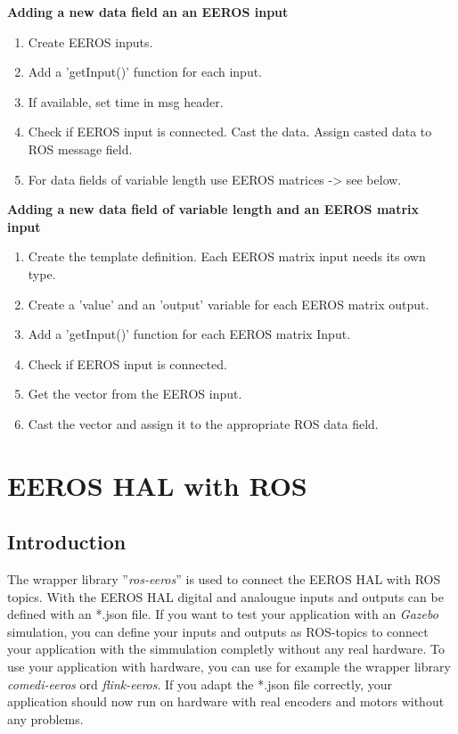 \textbf{Adding a new data field an an EEROS input}
\begin{enumerate}[\hspace{0.5cm}{B}-1]
\item Create EEROS inputs.
\item Add a 'getInput()' function for each input.
\item If available, set time in msg header.
\item Check if EEROS input is connected. Cast the data. Assign casted data to ROS message field.
\item For data fields of variable length use EEROS matrices -> see below.
\end{enumerate}

\textbf{Adding a new data field of variable length and an EEROS matrix input}
\begin{enumerate}[\hspace{0.5cm}{C}-1]
\item Create the template definition. Each EEROS matrix input needs its own type.
\item Create a 'value' and an 'output' variable for each EEROS matrix output.
\item Add a 'getInput()' function for each EEROS matrix Input.
\item Check if EEROS input is connected.
\item Get the vector from the EEROS input.
\item Cast the vector and assign it to the appropriate ROS data field.
\end{enumerate}



\section{EEROS HAL with ROS}
\subsection{Introduction}
The wrapper library ''\textit{ros-eeros}'' is used to connect the EEROS HAL with ROS topics.
With the EEROS HAL digital and analougue inputs and outputs can be defined with an *.json file.
If you want to test your application with an \textit{Gazebo} simulation, you can define your inputs and outputs as ROS-topics to connect your application with the simmulation completly without any real hardware.
To use your application with hardware, you can use for example the wrapper library \textit{comedi-eeros} ord \textit{flink-eeros}.
If you adapt the *.json file correctly, your application should now run on hardware with real encoders and motors without any problems.

